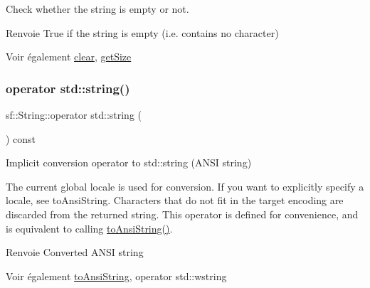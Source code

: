 Check whether the string is empty or not. 

\begin{DoxyReturn}{Renvoie}
True if the string is empty (i.\+e. contains no character)
\end{DoxyReturn}
\begin{DoxySeeAlso}{Voir également}
\hyperlink{classsf_1_1String_a391c1b4950cbf3d3f8040cea73af2969}{clear}, \hyperlink{classsf_1_1String_ae7aff54e178f5d3e399953adff5cad20}{get\+Size} 
\end{DoxySeeAlso}
\mbox{\label{classsf_1_1String_a884816a0f688cfd48f9324c9741dc257}} 
\subsubsection{\texorpdfstring{operator std\+::string()}{operator std::string()}}
{\footnotesize\ttfamily sf\+::\+String\+::operator std\+::string (\begin{DoxyParamCaption}{ }\end{DoxyParamCaption}) const}



Implicit conversion operator to std\+::string (A\+N\+SI string) 

The current global locale is used for conversion. If you want to explicitly specify a locale, see to\+Ansi\+String. Characters that do not fit in the target encoding are discarded from the returned string. This operator is defined for convenience, and is equivalent to calling \hyperlink{classsf_1_1String_ada5d5bba4528aceb0a1e298553e6c30a}{to\+Ansi\+String()}.

\begin{DoxyReturn}{Renvoie}
Converted A\+N\+SI string
\end{DoxyReturn}
\begin{DoxySeeAlso}{Voir également}
\hyperlink{classsf_1_1String_ada5d5bba4528aceb0a1e298553e6c30a}{to\+Ansi\+String}, operator std\+::wstring 
\end{DoxySeeAlso}
\mbox{\label{classsf_1_1String_a6bd1444bebaca9bbf01ba203061f5076}} 
